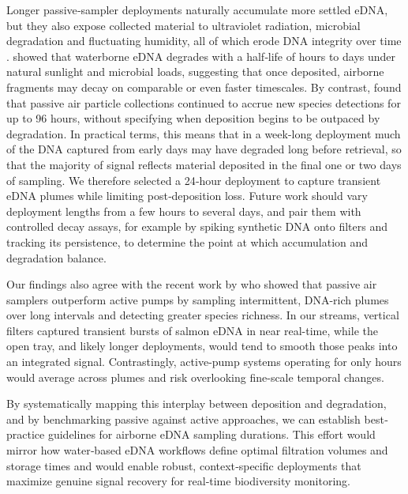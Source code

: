 \documentclass{article}
\begin{document}
Longer passive‐sampler deployments naturally accumulate more settled eDNA, but they also expose collected material to ultraviolet radiation, microbial degradation and fluctuating humidity, all of which erode DNA integrity over time \cite{brandao-dias2023}. \cite{strickler2015} showed that waterborne eDNA degrades with a half‐life of hours to days under natural sunlight and microbial loads, suggesting that once deposited, airborne fragments may decay on comparable or even faster timescales. By contrast, \cite{klepke2022} found that passive air particle collections continued to accrue new species detections for up to 96 hours, without specifying when deposition begins to be outpaced by degradation. In practical terms, this means that in a week-long deployment much of the DNA captured from early days may have degraded long before retrieval, so that the majority of signal reflects material deposited in the final one or two days of sampling. We therefore selected a 24‐hour deployment to capture transient eDNA plumes while limiting post‐deposition loss\cite{johnson2023}. Future work should vary deployment lengths from a few hours to several days, and pair them with controlled decay assays, for example by spiking synthetic DNA onto filters and tracking its persistence, to determine the point at which accumulation and degradation balance.

Our findings also agree with the recent work by \cite{jager2025} who showed that passive air samplers outperform active pumps by sampling intermittent, DNA-rich plumes over long intervals and detecting greater species richness. In our streams, vertical filters captured transient bursts of salmon eDNA in near real-time, while the open tray, and likely longer deployments, would tend to smooth those peaks into an integrated signal. Contrastingly, active-pump systems operating for only hours would average across plumes and risk overlooking fine-scale temporal changes.

By systematically mapping this interplay between deposition and degradation, and by benchmarking passive against active approaches, we can establish best‐practice guidelines for airborne eDNA sampling durations. This effort would mirror how water‐based eDNA workflows define optimal filtration volumes and storage times \cite{barnes2016,altermatt2025} and would enable robust, context‐specific deployments that maximize genuine signal recovery for real‐time biodiversity monitoring.
\end{document}
